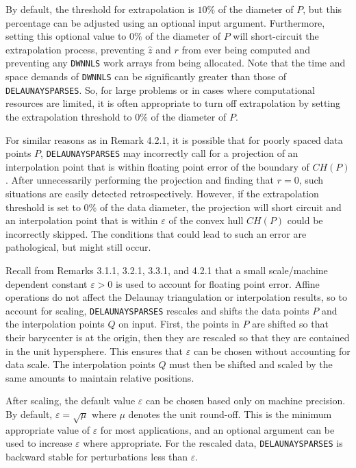 {By default, the threshold for extrapolation is $10\%$ of the diameter of
$P$, but this percentage can be adjusted using an optional input argument.
Furthermore, setting this optional value to $0\%$ of the diameter of $P$
will short-circuit the extrapolation process, preventing ${\hat z}$
and $r$ from ever being computed and preventing any {\tt DWNNLS}
work arrays from being allocated. Note that the time and space demands
of {\tt DWNNLS} can be significantly greater than those of
{\tt DELAUNAYSPARSES}. So, for large problems or in cases where
computational resources are limited, it is often appropriate to turn off
extrapolation by setting the extrapolation threshold to $0\%$ of the
diameter of $P$.

\enspace
For similar reasons as in Remark 4.2.1, it is possible that for poorly
spaced data points $P$, {\tt DELAUNAYSPARSES} may incorrectly call for
a projection of an interpolation point that is within floating point
error of the boundary of $CH(P)$. After unnecessarily performing the
projection and finding that $r=0$, such situations are easily
detected retrospectively. However, if the extrapolation threshold is
set to 0\% of the data diameter, the projection will short circuit
and an interpolation point that is within $\varepsilon$ of the convex
hull $CH(P)$ could be incorrectly skipped. The conditions that could
lead to such an error are pathological, but might still occur.
\medskip


Recall from Remarks 3.1.1, 3.2.1, 3.3.1, and 4.2.1 that a small
scale/machine dependent constant $\varepsilon > 0$ is used to account
for floating point error. Affine operations do not affect the Delaunay
triangulation or interpolation results, so to account for scaling, 
{\tt DELAUNAYSPARSES} rescales and shifts the data points $P$ and
the interpolation points $Q$ on input. First, the points in $P$ are
shifted so that their barycenter is at the origin, then they are rescaled
so that they are contained in the unit hypersphere. This ensures
that $\varepsilon$ can be chosen without accounting for data scale.
The interpolation points $Q$ must then be shifted and scaled by the same
amounts to maintain relative positions.

After scaling, the default value $\varepsilon$ can be chosen based
only on machine precision. By default, $\varepsilon = \sqrt{\mu}$
where $\mu$ denotes the unit round-off. This is the minimum appropriate
value of $\varepsilon$ for most applications, and an optional argument
can be used to increase $\varepsilon$ where appropriate. For the rescaled
data, {\tt DELAUNAYSPARSES} is backward stable for perturbations less
than $\varepsilon$.

}
